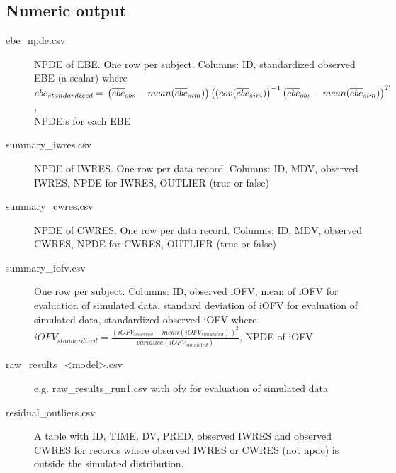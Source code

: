 \subsection{Numeric output}
\begin{description}
\item[ebe\_npde.csv] NPDE of EBE. One row per subject. Columns: ID, standardized observed EBE (a scalar) where 
$ebe_{standardized}= \\
\left(\overline{ebe}_{obs} - mean (\overline{ebe}_{sim})\right)\left((cov(\overline{ebe}_{sim})\right)^{-1}
\left(\overline{ebe}_{obs} - mean (\overline{ebe}_{sim})\right)^T$,\\ 
NPDE:s for each EBE
\item[summary\_iwres.csv] NPDE of IWRES. One row per data record. Columns: ID, MDV, observed IWRES, NPDE for IWRES, OUTLIER (true or false)
\item[summary\_cwres.csv] NPDE of CWRES. One row per data record. Columns: ID, MDV, observed CWRES, NPDE for CWRES, OUTLIER (true or false)
\item[summary\_iofv.csv] One row per subject. Columns: ID, observed iOFV, mean of iOFV for evaluation of simulated data,
standard deviation of iOFV for evaluation of simulated data, standardized observed iOFV where
$iOFV_{standardized}=\frac{(iOFV_{observed} - mean (iOFV_{simulated}))^2}{variance(iOFV_{simulated})}$, NPDE of iOFV
\item[raw\_results\_<model>.csv] e.g. raw\_results\_run1.csv with ofv for evaluation of simulated data
\item[residual\_outliers.csv] A table with ID, TIME, DV, PRED, observed IWRES and observed CWRES for records where observed IWRES or CWRES (not npde) is outside the simulated distribution.
\end{description}

